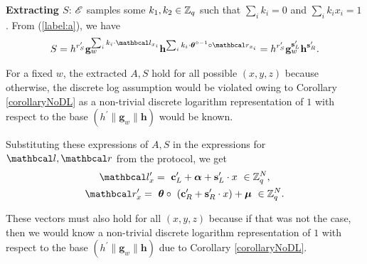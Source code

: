   \textbf{Extracting $S$}: $\mathscr{E}$ samples some $k_1, k_2 \in \mathbb{Z}_q$ such that $\sum_{i}k_i=0$ and $\sum_{i}k_ix_i=1$. From (\ref{label:a}), we have
  \begin{gather}
    S = h^{r_S^{\prime}} \textbf{g}_w^{\sum_i k_i \cdot \lvec_{x_i}} \textbf{h}^{\sum_i k_i \cdot \vecnb{\theta}^{\circ -1} \circ \rvec_{x_i}} = h^{r_S^{\prime}} \textbf{g}_w^{\textbf{s}_L^{\prime}} \textbf{h}^{\textbf{s}_R^{\prime}}.
  \end{gather}
  
  For a fixed $w$, the extracted $A, S$ hold for all possible $(x,y,z)$ because otherwise, the discrete log assumption would be violated owing to Corollary \ref{corollaryNoDL} as a non-trivial discrete logarithm representation of $1$ with respect to the base $(h^{\prime}\| \textbf{g}_w \| \textbf{h})$ would be known.
  
  Substituting these expressions of $A, S$ in the expressions for $\lvec, \rvec$ from the protocol, we get
  \begin{gather*}
      \lvec_x^{\prime} = \ \textbf{c}_L^{\prime} + \vecnb{\alpha} + \textbf{s}_L^{\prime} \cdot x \ \in \Z_q^N, \\
      \rvec_x^{\prime} = \ \vecnb{\theta} \circ \ (\textbf{c}_R^{\prime} + \textbf{s}_R^{\prime} \cdot x) + \vecnb{\mu} \ \in \Z^N_q.
  \end{gather*}
  
  These vectors must also hold for all $(x,y,z)$ because if that was not the case, then we would know a non-trivial discrete logarithm representation of $1$ with respect to the base $(h^{\prime}\| \textbf{g}_w \| \textbf{h})$ due to Corollary \ref{corollaryNoDL}.\\
  
